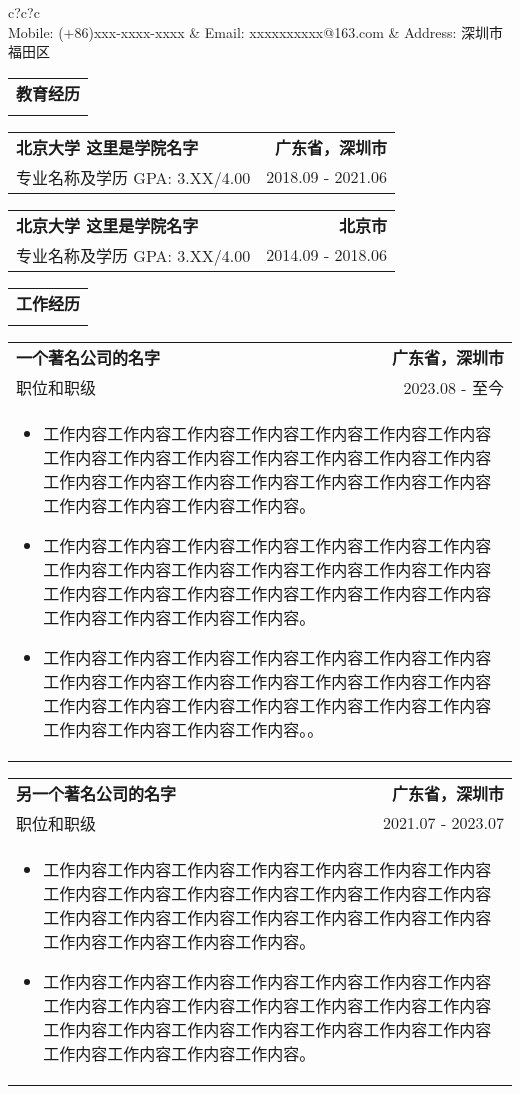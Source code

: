 \documentclass[letterpaper,10pt]{article}
\makeatletter
\newcommand{\thickhline}{\Xhline{2pt}} %
\newcommand{\sectiontitle}[1]{
	\begin{tabular*}{\textwidth}{l}
		{\Large \textbf{#1}} \\
		\thickhline
	\end{tabular*}
	\vspace{-0.8em}
}
\newcommand{\educationsection}[4]{
	\begin{tabular*}{\textwidth}{l@{\extracolsep{\fill}}r}
		\textbf{#1} & \textbf{#2} \\
		#3 & #4
	\end{tabular*}
}
\newcommand{\careersection}[5]{
	\begin{tabular*}{\textwidth}{l@{\extracolsep{\fill}}r}
		\textbf{#1} & \textbf{#2} \\
		#3 & #4 \\
		\multicolumn{2}{l}{#5} \\
	\end{tabular*}
}
\makeatother
\begin{document}
	
\centering
\begin{tabular}{c?c?c}
	\\
	Mobile: (+86)xxx-xxxx-xxxx &
	Email: xxxxxxxxxx@163.com &
	Address: 深圳市 \space 福田区 \\ 
\end{tabular}

\vspace{1em}
\sectiontitle{教育经历}

\educationsection{北京大学 \space 这里是学院名字}{广东省，深圳市}{专业名称及学历 \space GPA: 3.XX/4.00}{2018.09 - 2021.06}

\educationsection{北京大学 \space 这里是学院名字}{北京市}{专业名称及学历 \space GPA: 3.XX/4.00}{2014.09 - 2018.06}

\sectiontitle{工作经历}

\careersection{一个著名公司的名字}{广东省，深圳市}{职位和职级}{2023.08 - 至今}{
	\parbox{0.97\textwidth}{
		\begin{itemize}
			\item 工作内容工作内容工作内容工作内容工作内容工作内容工作内容工作内容工作内容工作内容工作内容工作内容工作内容工作内容工作内容工作内容工作内容工作内容工作内容工作内容工作内容工作内容工作内容工作内容工作内容。
			\item 工作内容工作内容工作内容工作内容工作内容工作内容工作内容工作内容工作内容工作内容工作内容工作内容工作内容工作内容工作内容工作内容工作内容工作内容工作内容工作内容工作内容工作内容工作内容工作内容工作内容。
			\item 工作内容工作内容工作内容工作内容工作内容工作内容工作内容工作内容工作内容工作内容工作内容工作内容工作内容工作内容工作内容工作内容工作内容工作内容工作内容工作内容工作内容工作内容工作内容工作内容工作内容。。
		\end{itemize}
	}
}

\careersection{另一个著名公司的名字}{广东省，深圳市}{职位和职级}{2021.07 - 2023.07}{
	\parbox{0.97\textwidth}{
		\begin{itemize}
			\item 工作内容工作内容工作内容工作内容工作内容工作内容工作内容工作内容工作内容工作内容工作内容工作内容工作内容工作内容工作内容工作内容工作内容工作内容工作内容工作内容工作内容工作内容工作内容工作内容工作内容。
			\item 工作内容工作内容工作内容工作内容工作内容工作内容工作内容工作内容工作内容工作内容工作内容工作内容工作内容工作内容工作内容工作内容工作内容工作内容工作内容工作内容工作内容工作内容工作内容工作内容工作内容。
		\end{itemize}
	}
}
\end{document}
